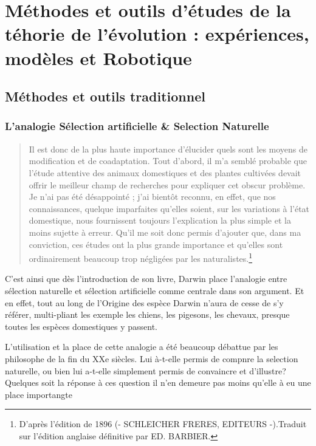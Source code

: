 \chapter{Méthodes et outils d'études de la téhorie de l'évolution : expériences, modèles et Robotique}

\section{Méthodes et outils traditionnel}
\subsection{L'analogie Sélection artificielle \& Selection Naturelle}\label{sec:cmpdr:sa}

\begin{quote}
	Il est donc de la plus haute importance d'élucider quels sont les moyens de modification et de coadaptation. Tout d'abord, il m'a semblé probable que l'étude attentive des animaux domestiques et des plantes cultivées devait offrir le meilleur champ de recherches pour expliquer cet obscur problème. Je n'ai pas été désappointé ; j'ai bientôt reconnu, en effet, que nos connaissances, quelque imparfaites qu'elles soient, sur les variations à l'état domestique, nous fournissent toujours l'explication la plus simple et la moins sujette à erreur. Qu'il me soit donc permis d'ajouter que, dans ma conviction, ces études ont la plus grande importance et qu'elles sont ordinairement beaucoup trop négligées par les naturalistes.\footnote{\citet[Introduction]{darwin1859originspeciesbymeansnaturalselectionorpreservationfavouredracesstrugglelife}	D'après l'édition de 1896 (- SCHLEICHER FRERES, EDITEURS -).Traduit sur l'édition anglaise définitive par ED. BARBIER.
}
\end{quote}

C'est ainsi que dès l'introduction de son livre, Darwin place l'analogie entre sélection naturelle et sélection artificielle comme centrale dans son argument. Et en effet, tout au long de l'Origine des espèce Darwin n'aura de cesse de s'y référer, multi-pliant les exemple les chiens, les pigesons, les chevaux, presque toutes les espèces domestiques y passent. 

L'utilisation et la place de cette analogie a été beaucoup débattue par les philosophe de la fin du XXe siècles. Lui à-t-elle permis de compnre la selection naturelle, ou bien lui a-t-elle simplement permis de convaincre et d'illustre? 
Quelques soit la réponse à ces question il n'en demeure pas moins qu'elle à eu une place importangte 

